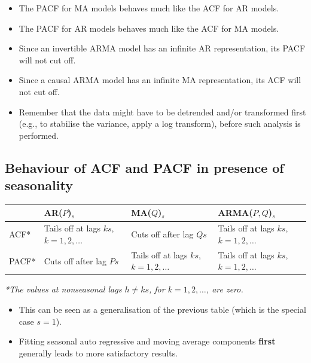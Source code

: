 \documentclass[11pt]{article}
\begin{document}
\begin{itemize}[leftmargin=*]
  \item The PACF for MA models behaves much like the ACF for AR models.
  \item The PACF for AR models behaves much like the ACF for MA models.
  \item Since an invertible ARMA model has an infinite AR representation, its PACF will not cut off.
  \item Since a causal ARMA model has an infinite MA representation, its ACF will not cut off.
  \item Remember that the data might have to be detrended and/or transformed first (e.g., to stabilise the variance, apply a log transform), before such analysis is performed.
\end{itemize}

\subsection{Behaviour of ACF and PACF in presence of seasonality}
\begin{table}[ht]
\centering
\renewcommand{\arraystretch}{1.2}
\begin{tabularx}{\textwidth}{lX X X}
\toprule
 & AR($P$)$_s$ & MA($Q$)$_s$ & ARMA($P, Q$)$_s$ \\
\midrule
ACF*  & Tails off at lags $ks$, $k=1,2,\ldots$ 
      & Cuts off after lag $Qs$ 
      & Tails off at lags $ks$, $k=1,2,\ldots$ \\

PACF* & Cuts off after lag $Ps$ 
      & Tails off at lags $ks$, $k=1,2,\ldots$ 
      & Tails off at lags $ks$, $k=1,2,\ldots$ \\
\bottomrule
\end{tabularx}
\end{table}

\vspace{0.5em}
\noindent
\textit{*The values at nonseasonal lags $h \ne ks$, for $k = 1, 2, \ldots$, are zero.}

\vspace{1em}

\begin{itemize}[leftmargin=*]
  \item This can be seen as a generalisation of the previous table (which is the special case $s=1$).
  \item Fitting seasonal auto regressive and moving average components \textbf{first} generally leads to more satisfactory results.
\end{itemize}
\end{document}
